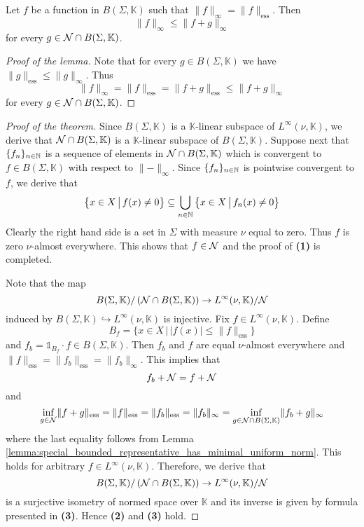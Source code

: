 \begin{lemma}\label{lemma:special_bounded_representative_has_minimal_uniform_norm}
    Let $f$ be a function in $B(\Sigma, \mathbb{K})$ such that $\lVert f \rVert_{\infty} = \lVert f \rVert_{\mathrm{ess}}$. Then
    $$\lVert f \rVert_{\infty} \leq \lVert f + g \rVert_{\infty}$$
    for every $g \in {\mathcal N} \cap B(\Sigma, \mathbb{K})$.
\end{lemma}
\begin{proof}[Proof of the lemma]
    Note that for every $g \in B(\Sigma, \mathbb{K})$ we have $\lVert g \rVert_{\mathrm{ess}} \leq \lVert g \rVert_{\infty}$. Thus
    $$\lVert f \rVert_{\infty} = \lVert f \rVert_{\mathrm{ess}} = \lVert f + g \rVert_{\mathrm{ess}} \leq \lVert f + g \rVert_{\infty}$$
    for every $g \in {\mathcal N} \cap B(\Sigma, \mathbb{K})$.
\end{proof}

\begin{proof}[Proof of the theorem]
    Since $B(\Sigma,\mathbb{K})$ is a $\mathbb{K}$-linear subspace of $L^{\infty}(\nu,\mathbb{K})$, we derive that ${\mathcal N}\cap B(\Sigma, \mathbb{K})$ is a $\mathbb{K}$-linear subspace of $B(\Sigma,\mathbb{K})$. Suppose next that $\{f_n\}_{n \in {\mathbb N}}$ is a sequence of elements in ${\mathcal N}\cap B(\Sigma,\mathbb{K})$ which is convergent to $f \in B(\Sigma,\mathbb{K})$ with respect to $\lVert - \rVert_{\infty}$. Since $\{f_n\}_{n\in {\mathbb N}}$ is pointwise convergent to $f$, we derive that
    $$\big\{x\in X\,\big|\,f(x) \neq 0\big\} \subseteq \bigcup_{n\in {\mathbb N}}\big\{x\in X\,\big|\,f_n(x) \neq 0\big\}$$
    Clearly the right hand side is a set in $\Sigma$ with measure $\nu$ equal to zero. Thus $f$ is zero $\nu$-almost everywhere. This shows that $f \in {\mathcal N}$ and the proof of \textbf{(1)} is completed.

    Note that the map
    $$B(\Sigma,\mathbb{K})/\left({\mathcal N}\cap B(\Sigma,\mathbb{K})\right) \rightarrow L^{\infty}(\nu,\mathbb{K})/{\mathcal N}$$
    induced by $B(\Sigma, \mathbb{K})\hookrightarrow L^{\infty}(\nu,\mathbb{K})$ is injective. Fix $f \in L^{\infty}(\nu,\mathbb{K})$. Define
    $$B_f = \big\{x \in X\,\big|\,|f(x)| \leq \lVert f \rVert_{\mathrm{ess}}\big\}$$
    and $f_b = \mathbb{1}_{B_f}\cdot f \in B(\Sigma,\mathbb{K})$. Then $f_b$ and $f$ are equal $\nu$-almost everywhere and $\lVert f \rVert_{\mathrm{ess}} = \lVert f_b\rVert_{\mathrm{ess}} = \lVert f_b \rVert_{\infty}$. This implies that
    $$f_b + {\mathcal N} = f + {\mathcal N}$$
    and
    $$\inf_{g \in {\mathcal N}} \lVert f + g \rVert_{\mathrm{ess}} = \lVert f \rVert_{\mathrm{ess}} = \lVert f_b \rVert_{\mathrm{ess}} = \lVert f_b \rVert_{\infty} =  \inf_{g \in {\mathcal N} \cap B(\Sigma, \mathbb{K})}\lVert f_b + g\rVert_{\infty}$$
    where the last equality follows from Lemma \ref{lemma:special_bounded_representative_has_minimal_uniform_norm}. This holds for arbitrary $f \in L^{\infty}(\nu,\mathbb{K})$. Therefore, we derive that
    $$B(\Sigma,\mathbb{K})/\left({\mathcal N}\cap B(\Sigma,\mathbb{K})\right) \rightarrow L^{\infty}(\nu,\mathbb{K})/{\mathcal N}$$
    is a surjective isometry of normed space over $\mathbb{K}$ and its inverse is given by formula presented in \textbf{(3)}. Hence \textbf{(2)} and \textbf{(3)} hold.
\end{proof}

